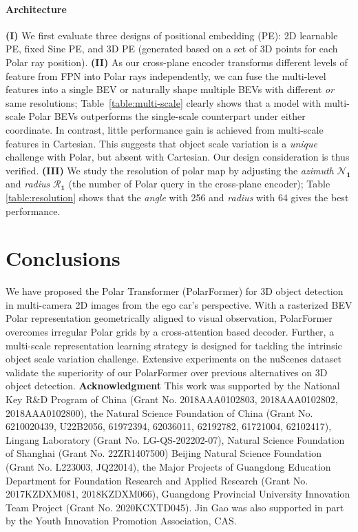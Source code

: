 \documentclass[letterpaper]{article} \usepackage{aaai23}  \usepackage{times}  \usepackage{helvet}  \usepackage{courier}  \usepackage[hyphens]{url}  \usepackage{graphicx} \urlstyle{rm} \def\UrlFont{\rm}  \usepackage{natbib}  \usepackage{caption} \frenchspacing  \setlength{\pdfpagewidth}{8.5in} \setlength{\pdfpageheight}{11in} \usepackage{algorithm}
\begin{document}
\paragraph{Architecture }
\textbf{(I)}
We first evaluate three designs of positional embedding (PE):
2D learnable PE, fixed Sine PE, and 3D PE (generated based on a set of 3D points for each Polar ray position).
\textbf{(II)}
As our cross-plane encoder transforms different levels of feature from FPN into Polar rays independently, we can fuse the multi-level features into a single BEV or naturally shape multiple BEVs with different \textit{or} same resolutions;
Table~\ref{table:multi-scale} clearly shows that a model with multi-scale Polar BEVs outperforms the single-scale counterpart under either coordinate.
In contrast, little performance gain is achieved from multi-scale features in Cartesian.
This suggests that object scale variation is a {\em unique} challenge with Polar, but absent with Cartesian.
Our design consideration is thus verified.
\textbf{(III)} 
We study the resolution of polar map by adjusting the \textit{azimuth} $\bm{\mathcal{N}_1}$ and \textit{radius} $\bm{\mathcal{R}_1}$  (the number of Polar query in the cross-plane encoder);
Table \ref{table:resolution} shows that the \textit{angle} with 256 and \textit{radius} with 64 gives the best performance. \section{Conclusions}

We have proposed the Polar Transformer (PolarFormer) for 3D object detection in multi-camera 2D images from the ego car's perspective.
With a rasterized BEV Polar representation geometrically aligned to visual observation, 
PolarFormer overcomes irregular Polar grids by a cross-attention based decoder.
Further, a multi-scale representation learning strategy is designed 
for tackling the intrinsic object scale variation challenge.
Extensive experiments on the nuScenes dataset validate 
the superiority of our PolarFormer over previous alternatives on 3D object detection. 
\vspace{2mm}
\noindent \textbf{Acknowledgment} This work was supported by the National Key R$\&$D Program of China (Grant No. 2018AAA0102803, 2018AAA0102802, 2018AAA0102800), 
the Natural Science Foundation of China (Grant No. 6210020439, U22B2056, 61972394, 62036011, 62192782, 61721004, 62102417), 
Lingang Laboratory (Grant No. LG-QS-202202-07),
Natural Science Foundation of Shanghai (Grant No. 22ZR1407500)
Beijing Natural Science Foundation (Grant No. L223003, JQ22014), 
the Major Projects of Guangdong Education Department for Foundation Research and Applied Research (Grant No. 2017KZDXM081, 2018KZDXM066), 
Guangdong Provincial University Innovation Team Project (Grant No. 2020KCXTD045). 
Jin Gao was also supported in part by the Youth Innovation Promotion Association, CAS.

\end{document}
